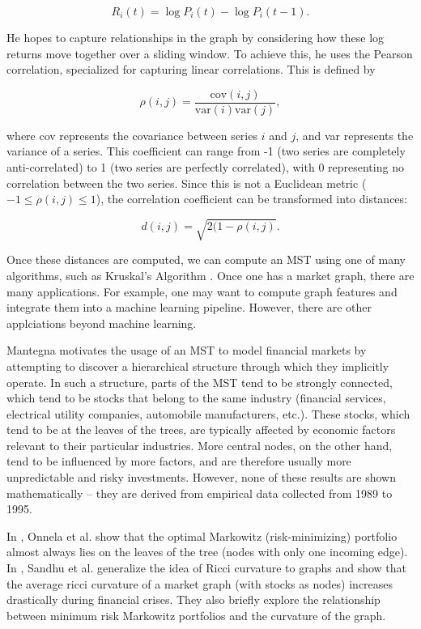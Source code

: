 \documentclass[12pt]{article}
\theoremstyle{definition}
\begin{document}
\[
R_i(t) = \log P_i(t) - \log P_i(t-1).
\]

He hopes to capture relationships in the graph by considering how these log returns move together over a sliding window. To achieve this, he uses the Pearson correlation, specialized for capturing linear correlations. This is defined by

\[
\rho(i,j) = \frac{\text{cov}(i, j)}{\text{var}(i) \text{var}(j)},
\]

where cov represents the covariance between series $i$ and $j$, and var represents the variance of a series. This coefficient can range from -1 (two series are completely anti-correlated) to 1 (two series are perfectly correlated), with 0 representing no correlation between the two series. Since this is not a Euclidean metric ($-1 \leq \rho(i,j) \leq 1$), the correlation coefficient can be transformed into distances:

\[
d(i,j) = \sqrt{2(1 - \rho(i,j)}.
\]

Once these distances are computed, we can compute an MST using one of many algorithms, such as Kruskal's Algorithm \cite{kruskalsAlgorithm}\cite{networkSurveyFinance}. Once one has a market graph, there are many applications. For example, one may want to compute graph features and integrate them into a machine learning pipeline. However, there are other applciations beyond machine learning.

Mantegna motivates the usage of an MST to model financial markets by attempting to discover a hierarchical structure through which they implicitly operate. In such a structure, parts of the MST tend to be strongly connected, which tend to be stocks that belong to the same industry (financial services, electrical utility companies, automobile manufacturers, etc.). These stocks, which tend to be at the leaves of the trees, are typically affected by economic factors relevant to their particular industries. More central nodes, on the other hand, tend to be influenced by more factors, and are therefore usually more unpredictable and risky investments. However, none of these results are shown mathematically -- they are derived from empirical data collected from 1989 to 1995.

In \cite{dynamicsMarketCorrelations}, Onnela et al. show that the optimal Markowitz (risk-minimizing) portfolio almost always lies on the leaves of the tree (nodes with only one incoming edge). In \cite{sandhu2015market}, Sandhu et al. generalize the idea of Ricci curvature to graphs and show that the average ricci curvature of a market graph (with stocks as nodes) increases drastically during financial crises. They also briefly explore the relationship between minimum risk Markowitz portfolios and the curvature of the graph.
\end{document}

